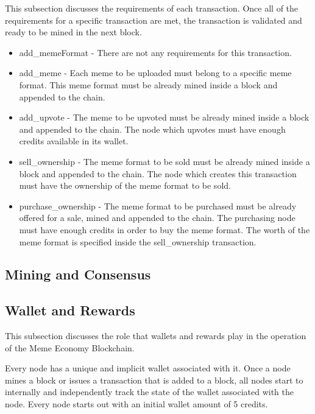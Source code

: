 \documentclass[12pt]{article}
\begin{document}
This subsection discusses the requirements of each transaction. Once all of the requirements for a specific transaction are met, the transaction is validated and ready to be mined in the next block.

\begin{itemize}
\item add\_memeFormat - There are not any requirements for this transaction.

\item add\_meme - Each meme to be uploaded must belong to a specific meme format. This meme format must be already mined inside a block and appended to the chain.

\item add\_upvote - The meme to be upvoted must be already mined inside a block and appended to the chain. The node which upvotes must have enough credits available in its wallet.

\item sell\_ownership - The meme format to be sold must be already mined inside a block and appended to the chain. The node which creates this transaction must have the ownership of the meme format to be sold.

\item purchase\_ownership - The meme format to be purchased must be already offered for a sale, mined and appended to the chain. The purchasing node must have enough credits in order to buy the meme format. The worth of the meme format is specified inside the sell\_ownership transaction.
\end{itemize}


\subsection{Mining and Consensus} %
\subsection{Wallet and Rewards} %

This subsection discusses the role that wallets and rewards play in the operation of the Meme Economy Blockchain.

Every node has a unique and implicit wallet associated with it. Once a node mines a block or issues a transaction that is added to a block, all nodes start to internally and independently track the state of the wallet associated with the node. Every node starts out with an initial wallet amount of 5 credits. %
\end{document}
